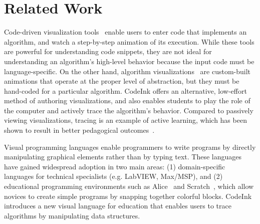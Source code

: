 \section{Related Work}

Code-driven visualization tools~\cite{Guo2013, Sorva2013} enable users to enter
code that implements an algorithm, and watch a step-by-step animation of its
execution. While these tools are powerful for understanding code snippets, they
are not ideal for understanding an algorithm's high-level behavior because the
input code must be language-specific. On the other hand, algorithm
visualizations~\cite{AlgoViz} are custom-built animations that operate at the
proper level of abstraction, but they must be hand-coded for a particular
algorithm. CodeInk offers an alternative, low-effort method of authoring
visualizations, and also enables students to play the role of the computer and
actively trace the algorithm's behavior. Compared to passively viewing visualizations,
tracing is an example of active learning, which has been shown
to result in better pedagogical outcomes~\cite{Sorva2012Diss}.




Visual programming languages enable programmers to write programs by directly
manipulating graphical elements rather than by typing text. These languages have
gained widespread adoption in two main areas:
(1) domain-specific languages for technical specialists (e.g. LabVIEW, Max/MSP),
and (2) educational programming environments such as Alice~\cite{Alice2008} and
Scratch~\cite{Scratch2008}, which allow novices to create simple programs by
snapping together colorful blocks. CodeInk introduces a new visual
language for education that enables users to trace algorithms by
manipulating data structures.

